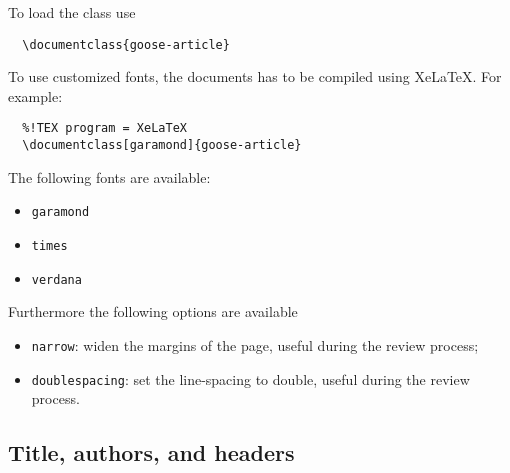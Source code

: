 \documentclass[garamond,namecite]{goose-article}
\begin{document}
To load the class use
\begin{verbatim}
  \documentclass{goose-article}
\end{verbatim}
%
To use customized fonts, the documents has to be compiled using XeLaTeX. For example:
\begin{verbatim}
  %!TEX program = XeLaTeX
  \documentclass[garamond]{goose-article}
\end{verbatim}
%
The following fonts are available:
%
\begin{itemize}
  \item \texttt{garamond}
  \item \texttt{times}
  \item \texttt{verdana}
\end{itemize}
%
%
Furthermore the following options are available
%
\begin{itemize}
  \item \texttt{narrow}: widen the margins of the page, useful during the review process;
  \item \texttt{doublespacing}: set the line-spacing to double, useful during the review process.
\end{itemize}
%

\subsection{Title, authors, and headers}
\end{document}
